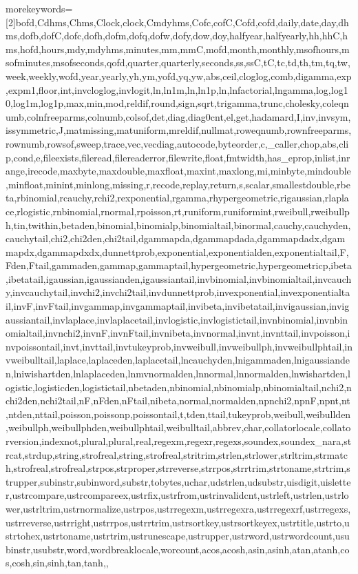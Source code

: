 {    morekeywords=[2]{bofd,Cdhms,Chms,Clock,clock,Cmdyhms,Cofc,cofC,Cofd,cofd,daily,date,day,dhms,dofb,dofC,dofc,dofh,dofm,dofq,dofw,dofy,dow,doy,halfyear,halfyearly,hh,hhC,hms,hofd,hours,mdy,mdyhms,minutes,mm,mmC,mofd,month,monthly,msofhours,msofminutes,msofseconds,qofd,quarter,quarterly,seconds,ss,ssC,tC,tc,td,th,tm,tq,tw,week,weekly,wofd,year,yearly,yh,ym,yofd,yq,yw,abs,ceil,cloglog,comb,digamma,exp,expm1,floor,int,invcloglog,invlogit,ln,ln1m,ln,ln1p,ln,lnfactorial,lngamma,log,log10,log1m,log1p,max,min,mod,reldif,round,sign,sqrt,trigamma,trunc,cholesky,coleqnumb,colnfreeparms,colnumb,colsof,det,diag,diag0cnt,el,get,hadamard,I,inv,invsym,issymmetric,J,matmissing,matuniform,mreldif,nullmat,roweqnumb,rownfreeparms,rownumb,rowsof,sweep,trace,vec,vecdiag,autocode,byteorder,c,_caller,chop,abs,clip,cond,e,fileexists,fileread,filereaderror,filewrite,float,fmtwidth,has_eprop,inlist,inrange,irecode,maxbyte,maxdouble,maxfloat,maxint,maxlong,mi,minbyte,mindouble,minfloat,minint,minlong,missing,r,recode,replay,return,s,scalar,smallestdouble,rbeta,rbinomial,rcauchy,rchi2,rexponential,rgamma,rhypergeometric,rigaussian,rlaplace,rlogistic,rnbinomial,rnormal,rpoisson,rt,runiform,runiformint,rweibull,rweibullph,tin,twithin,betaden,binomial,binomialp,binomialtail,binormal,cauchy,cauchyden,cauchytail,chi2,chi2den,chi2tail,dgammapda,dgammapdada,dgammapdadx,dgammapdx,dgammapdxdx,dunnettprob,exponential,exponentialden,exponentialtail,F,Fden,Ftail,gammaden,gammap,gammaptail,hypergeometric,hypergeometricp,ibeta,ibetatail,igaussian,igaussianden,igaussiantail,invbinomial,invbinomialtail,invcauchy,invcauchytail,invchi2,invchi2tail,invdunnettprob,invexponential,invexponentialtail,invF,invFtail,invgammap,invgammaptail,invibeta,invibetatail,invigaussian,invigaussiantail,invlaplace,invlaplacetail,invlogistic,invlogistictail,invnbinomial,invnbinomialtail,invnchi2,invnF,invnFtail,invnibeta,invnormal,invnt,invnttail,invpoisson,invpoissontail,invt,invttail,invtukeyprob,invweibull,invweibullph,invweibullphtail,invweibulltail,laplace,laplaceden,laplacetail,lncauchyden,lnigammaden,lnigaussianden,lniwishartden,lnlaplaceden,lnmvnormalden,lnnormal,lnnormalden,lnwishartden,logistic,logisticden,logistictail,nbetaden,nbinomial,nbinomialp,nbinomialtail,nchi2,nchi2den,nchi2tail,nF,nFden,nFtail,nibeta,normal,normalden,npnchi2,npnF,npnt,nt,ntden,nttail,poisson,poissonp,poissontail,t,tden,ttail,tukeyprob,weibull,weibullden,weibullph,weibullphden,weibullphtail,weibulltail,abbrev,char,collatorlocale,collatorversion,indexnot,plural,plural,real,regexm,regexr,regexs,soundex,soundex_nara,strcat,strdup,string,strofreal,string,strofreal,stritrim,strlen,strlower,strltrim,strmatch,strofreal,strofreal,strpos,strproper,strreverse,strrpos,strrtrim,strtoname,strtrim,strupper,subinstr,subinword,substr,tobytes,uchar,udstrlen,udsubstr,uisdigit,uisletter,ustrcompare,ustrcompareex,ustrfix,ustrfrom,ustrinvalidcnt,ustrleft,ustrlen,ustrlower,ustrltrim,ustrnormalize,ustrpos,ustrregexm,ustrregexra,ustrregexrf,ustrregexs,ustrreverse,ustrright,ustrrpos,ustrrtrim,ustrsortkey,ustrsortkeyex,ustrtitle,ustrto,ustrtohex,ustrtoname,ustrtrim,ustrunescape,ustrupper,ustrword,ustrwordcount,usubinstr,usubstr,word,wordbreaklocale,worcount,acos,acosh,asin,asinh,atan,atanh,cos,cosh,sin,sinh,tan,tanh,},
}
